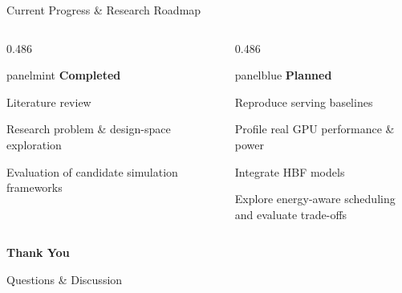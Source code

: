\documentclass[aspectratio=169,10pt]{beamer}
\begin{document}
\begin{frame}{Current Progress \& Research Roadmap}
  \begin{columns}[T,onlytextwidth]
    \begin{column}{0.486\textwidth}
      \begin{beamercolorbox}[rounded=true,sep=0.22cm,wd=\linewidth]{panelmint}
        {\normalsize\bfseries\color{Accent}Completed}\par\vspace{0.26cm}
        {\small Literature review}\par\vspace{0.24cm}
        {\small Research problem \& design-space exploration}\par\vspace{0.24cm}
        {\small Evaluation of candidate simulation frameworks}
      \end{beamercolorbox}
    \end{column}
    \begin{column}{0.486\textwidth}
      \begin{beamercolorbox}[rounded=true,sep=0.22cm,wd=\linewidth]{panelblue}
        {\normalsize\bfseries\color{AccentBlue}Planned}\par\vspace{0.26cm}
        {\small Reproduce serving baselines}\par\vspace{0.20cm}
        {\small Profile real GPU performance \& power}\par\vspace{0.20cm}
        {\small Integrate HBF models}\par\vspace{0.20cm}
        {\small Explore energy-aware scheduling\\and evaluate trade-offs}
      \end{beamercolorbox}
    \end{column}
  \end{columns}
\end{frame}

{
\begin{frame}[plain]
  \vfill
  \begin{center}
    {\fontsize{38}{44}\selectfont\bfseries\color{Ink}Thank You}\par
    \vspace{0.30cm}
    {\Large\color{Accent}Questions \& Discussion}
  \end{center}
  \vfill
\end{frame}}
\end{document}
